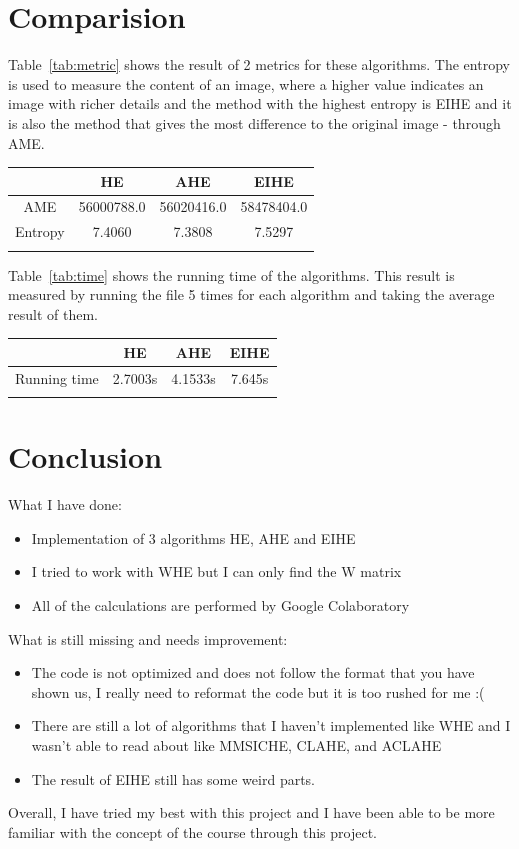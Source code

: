 \documentclass{article}
\begin{document}
	\section{Comparision}
	
	Table~\ref{tab:metric} shows the result of 2 metrics for these algorithms. The entropy is used to measure the content of an image, where a higher value indicates an image with richer details and the method with the highest entropy is EIHE and it is also the method that gives the most difference to the original image - through AME.
	
	\begin{center}
		\begin{tabular}{|c|c|c|c|}
			\hline
			& HE & AHE & EIHE \\ \hline
			AME & 56000788.0 & 56020416.0 & 58478404.0  \\ \hline
			Entropy & 7.4060 & 7.3808 & 7.5297  \\ \hline
			\label{tab:metric}
		\end{tabular}
	\end{center}
	
	Table~\ref{tab:time} shows the running time of the algorithms. This result is measured by running the file 5 times for each algorithm and taking the average result of them. 
	
	\begin{center}
		\begin{tabular}{|c|c|c|c|}
			\hline
			& HE & AHE & EIHE \\ \hline
			Running time & 2.7003s & 4.1533s & 7.645s \\ \hline
			\label{tab:time}
		\end{tabular}
	\end{center}
	
	\section{Conclusion}
	
	What I have done:
	\begin{itemize}
		\item Implementation of 3 algorithms HE, AHE and EIHE
		\item I tried to work with WHE but I can only find the W matrix
		\item All of the calculations are performed by Google Colaboratory
	\end{itemize}
	What is still missing and needs improvement:
	\begin{itemize}
		\item The code is not optimized and does not follow the format that you have shown us, I really need to reformat the code but it is too rushed for me :(
		\item There are still a lot of algorithms that I haven't implemented like WHE and I wasn't able to read about like MMSICHE, CLAHE, and ACLAHE
		\item The result of EIHE still has some weird parts.
	\end{itemize}
	
	Overall, I have tried my best with this project and I have been able to be more familiar with the concept of the course through this project.
	
\end{document}
